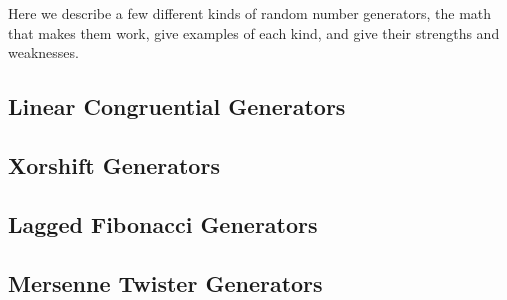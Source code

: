 Here we describe a few different kinds of random number generators, the math that makes them work, give examples of each kind, and give their strengths and weaknesses.

\subsection{Linear Congruential Generators}
\label{sec:lcg}


\subsection{Xorshift Generators}
\label{sec:xorshift}


\subsection{Lagged Fibonacci Generators}
\label{sec:laggedfib}


\subsection{Mersenne Twister Generators}
\label{sec:mt}

